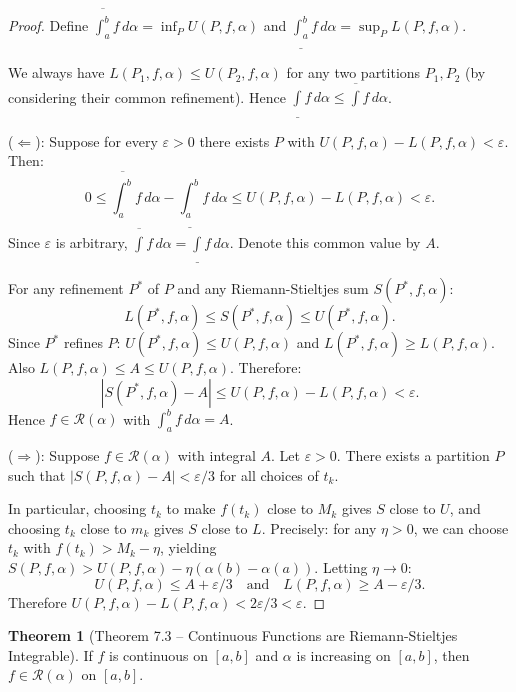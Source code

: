 \documentclass[12pt,a4paper]{article}
\theoremstyle{definition}
\newtheorem{theorem}{Theorem}[section]
\newcommand{\eps}{\varepsilon}
\begin{document}
\begin{proof}
Define $\overline{\int_a^b} f\,d\alpha = \inf_P U(P,f,\alpha)$ and $\underline{\int_a^b} f\,d\alpha = \sup_P L(P,f,\alpha)$.

We always have $L(P_1,f,\alpha) \leq U(P_2,f,\alpha)$ for any two partitions $P_1, P_2$ (by considering their common refinement). Hence $\underline{\int} f\,d\alpha \leq \overline{\int} f\,d\alpha$.

\medskip
($\Leftarrow$): Suppose for every $\eps > 0$ there exists $P$ with $U(P,f,\alpha) - L(P,f,\alpha) < \eps$. Then:
\[
    0 \leq \overline{\int_a^b} f\,d\alpha - \underline{\int_a^b} f\,d\alpha \leq U(P,f,\alpha) - L(P,f,\alpha) < \eps.
\]
Since $\eps$ is arbitrary, $\overline{\int} f\,d\alpha = \underline{\int} f\,d\alpha$. Denote this common value by $A$.

For any refinement $P^*$ of $P$ and any Riemann-Stieltjes sum $S(P^*, f, \alpha)$:
\[
    L(P^*, f, \alpha) \leq S(P^*, f, \alpha) \leq U(P^*, f, \alpha).
\]
Since $P^*$ refines $P$: $U(P^*,f,\alpha) \leq U(P,f,\alpha)$ and $L(P^*,f,\alpha) \geq L(P,f,\alpha)$. Also $L(P,f,\alpha) \leq A \leq U(P,f,\alpha)$. Therefore:
\[
    |S(P^*,f,\alpha) - A| \leq U(P,f,\alpha) - L(P,f,\alpha) < \eps.
\]
Hence $f \in \mathcal{R}(\alpha)$ with $\int_a^b f\,d\alpha = A$.

\medskip
($\Rightarrow$): Suppose $f \in \mathcal{R}(\alpha)$ with integral $A$. Let $\eps > 0$. There exists a partition $P$ such that $|S(P,f,\alpha) - A| < \eps/3$ for all choices of $t_k$.

In particular, choosing $t_k$ to make $f(t_k)$ close to $M_k$ gives $S$ close to $U$, and choosing $t_k$ close to $m_k$ gives $S$ close to $L$. Precisely: for any $\eta > 0$, we can choose $t_k$ with $f(t_k) > M_k - \eta$, yielding $S(P,f,\alpha) > U(P,f,\alpha) - \eta(\alpha(b)-\alpha(a))$. Letting $\eta \to 0$:
\[
    U(P,f,\alpha) \leq A + \eps/3 \quad \text{and} \quad L(P,f,\alpha) \geq A - \eps/3.
\]
Therefore $U(P,f,\alpha) - L(P,f,\alpha) < 2\eps/3 < \eps$.
\end{proof}

\begin{theorem}[Theorem 7.3 -- Continuous Functions are Riemann-Stieltjes Integrable]
If $f$ is continuous on $[a,b]$ and $\alpha$ is increasing on $[a,b]$, then $f \in \mathcal{R}(\alpha)$ on $[a,b]$.
\end{theorem}
\end{document}
